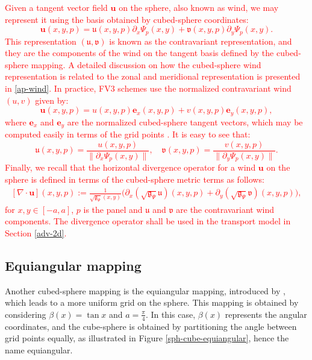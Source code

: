 \documentclass[preprint,12pt]{elsarticle}
\begin{document}
\begin{linenumbers}
\textcolor{red}{Given a tangent vector field $\boldsymbol{u}$ on the sphere, also known as wind, we may represent it using the basis obtained by cubed-sphere coordinates:
\begin{equation}
	\label{contravariant-wind}
	\boldsymbol{u}(x, y, p) = 
	\mathfrak{u}(x, y,p ) \partial_x{\Psi}_p(x, y) + 
	\mathfrak{v}(x, y, p) \partial_y{\Psi}_p(x, y).
\end{equation}
This representation $(\mathfrak{u},\mathfrak{v})$ is known as the contravariant representation, and they are the components of the wind on the tangent basis defined by the cubed-sphere mapping.
A detailed discussion on how the cubed-sphere wind representation is related to the zonal and meridional representation is presented in \ref{ap-wind}.
In practice, FV3 schemes \cite{putman:2007, harris:2021} use the normalized contravariant wind
$({u},{v})$ given by:
\begin{equation}
	\label{norm-contravariant-wind}
	\boldsymbol{u}(x, y, p) = 
	{u}(x, y, p) \boldsymbol{e}_x(x, y, p) + 
	{v}(x, y, p) \boldsymbol{e}_y(x, y, p),
\end{equation}
where $\boldsymbol{e}_x$ and $\boldsymbol{e}_y$ are the normalized cubed-sphere tangent vectors, which may be computed easily in terms of the grid points \cite[Appendix C2]{chen:2021}.
It is easy to see that:
\begin{equation}
	\label{contra-uv}
	\mathfrak{u}(x,y,p)  = \frac{{u}(x,y,p)}{\|\partial_x{\Psi}_p(x,y)\|}, \quad
	\mathfrak{v}(x,y,p)  = \frac{{v}(x,y,p)}{\|\partial_y{\Psi}_p(x,y)\|}.
\end{equation}
Finally, we recall that the horizontal divergence operator for a  wind $\boldsymbol{u}$  on the sphere is defined in terms of the cubed-sphere metric terms as follows:
\begin{align}
	\label{div-def}
	[\nabla \cdot {\boldsymbol{u}}](x,y,p) :=
	\frac{1}{\sqrt{\mathfrak{g}_{\Psi}}(x,y)}
	\bigg(
	\partial_x(\sqrt{\mathfrak{g}_{\Psi}}\mathfrak{u})(x,y,p) +
	\partial_y(\sqrt{\mathfrak{g}_{\Psi}}\mathfrak{v})(x,y,p)
	\bigg),
\end{align}
for $x,y\in[-a,a]$, $p$ is the panel and
$\mathfrak{u}$ and $\mathfrak{v}$ are the contravariant wind components.
The divergence operator shall be used in the transport model in Section \ref{adv-2d}.
}
\subsection{Equiangular mapping}
\label{cs-equiangular}
Another cubed-sphere mapping is the equiangular mapping, 
introduced by \cite{ronchi:1996}, which leads to a more uniform grid on the sphere.
This mapping is obtained by considering $\beta(x) = \tan{x}$ and $a=\frac{\pi}{4}$.
In this case, $\beta(x)$ represents the angular coordinates, and the cube-sphere is obtained by partitioning the angle between
grid points equally, as illustrated in Figure \ref{sph-cube-equiangular}, hence the name equiangular.


\end{linenumbers}
\end{document}

